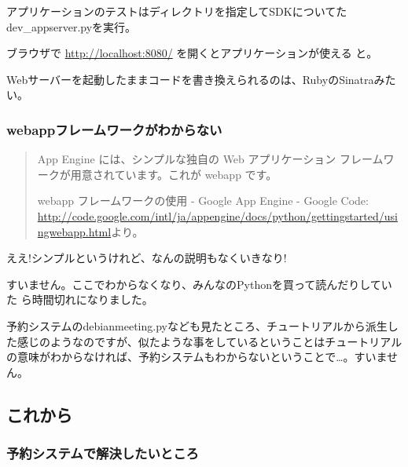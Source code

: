 \documentclass[mingoth,a4paper]{jsarticle}
\begin{document}
アプリケーションのテストはディレクトリを指定してSDKについてた
dev\_appserver.pyを実行。


ブラウザで \url{http://localhost:8080/} を開くとアプリケーションが使える
と。

Webサーバーを起動したままコードを書き換えられるのは、RubyのSinatraみたい。

\subsubsection{webappフレームワークがわからない}

\begin{quote}
App Engine には、シンプルな独自の Web アプリケーション フレームワークが用意されています。これが webapp です。

webapp フレームワークの使用 - Google App Engine - Google Code:
 \url{http://code.google.com/intl/ja/appengine/docs/python/gettingstarted/usingwebapp.html}より。

\end{quote}
 

ええ!シンプルというけれど、なんの説明もなくいきなり!

すいません。ここでわからなくなり、みんなのPythonを買って読んだりしていた
ら時間切れになりました。

予約システムのdebianmeeting.pyなども見たところ、チュートリアルから派生し
た感じのようなのですが、似たような事をしているということはチュートリアル
の意味がわからなければ、予約システムもわからないということで…。すいませ
ん。


\subsection{これから}


\subsubsection{予約システムで解決したいところ}
\end{document}
